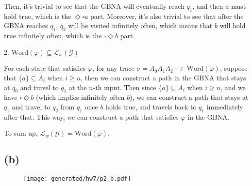 Then, it's trivial to see that the GBNA will eventually reach $q_1$, and then $a$ must hold true,
which is the $\Diamond \square a$ part.
Moreover, it's also trivial to see that after the GBNA reaches $q_1$, $q_2$ will be visited infinitely often,
which means that $b$ will hold true infinitely often, which is the $\square \Diamond b$ part.

2. $\text{Word}(\varphi) \subseteq \mathcal{L}_w(\mathcal{G})$

For each state that satisfies $\varphi$, for any trace $\sigma=A_0 A_1 A_2 \cdots \in \text{Word}(\varphi)$,
suppose that $\{a\} \subseteq A_i$ when $i \geq n$, then we can construct a path in the GBNA that stays at
$q_0$ and travel to $q_1$ at the $n$-th input. Then since $\{a\} \subseteq A_i$ when $i \geq n$, and we have
$\square \Diamond b$ (which implies infinitely often $b$), we can construct a path that stays at $q_1$ and
travel to $q_2$ from $q_1$ once $b$ holds true, and travels back to $q_1$ immediately after that.
This way, we can construct a path that satisfies $\varphi$ in the GBNA.

To sum up, $\mathcal{L}_w(\mathcal{G}) = \text{Word}(\varphi)$.

\subsection*{(b)}

\begin{figure}[H]
    \centering
    \texttt{[image: generated/hw7/p2\_b.pdf]}
\end{figure}
